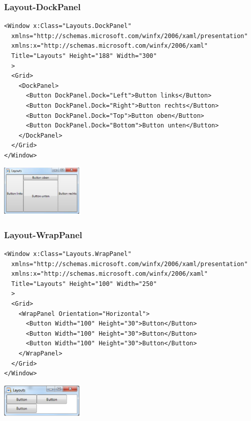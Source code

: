 \subsubsection{Layout-DockPanel}
\begin{minipage}{14cm}
\begin{lstlisting}[style=CSharp]
<Window x:Class="Layouts.DockPanel"
  xmlns="http://schemas.microsoft.com/winfx/2006/xaml/presentation"
  xmlns:x="http://schemas.microsoft.com/winfx/2006/xaml"
  Title="Layouts" Height="188" Width="300"
  >
  <Grid>
    <DockPanel>
      <Button DockPanel.Dock="Left">Button links</Button>
      <Button DockPanel.Dock="Right">Button rechts</Button>
      <Button DockPanel.Dock="Top">Button oben</Button>
      <Button DockPanel.Dock="Bottom">Button unten</Button>
    </DockPanel>
  </Grid>
</Window>
\end{lstlisting}
\end{minipage}
\begin{minipage}{4cm}
  \includegraphics[width=4cm]{images/XAML/DockPanel}
\end{minipage}

\subsubsection{Layout-WrapPanel}
\begin{minipage}{14cm}
\begin{lstlisting}[style=CSharp]
<Window x:Class="Layouts.WrapPanel"
  xmlns="http://schemas.microsoft.com/winfx/2006/xaml/presentation"
  xmlns:x="http://schemas.microsoft.com/winfx/2006/xaml"
  Title="Layouts" Height="100" Width="250"
  >
  <Grid>
    <WrapPanel Orientation="Horizontal">
      <Button Width="100" Height="30">Button</Button>
      <Button Width="100" Height="30">Button</Button>
      <Button Width="100" Height="30">Button</Button>
    </WrapPanel>
  </Grid>
</Window>
\end{lstlisting}
\end{minipage}
\begin{minipage}{4cm}
  \includegraphics[width=4cm]{images/XAML/WrapPanel}
\end{minipage}

